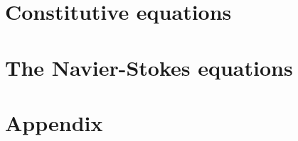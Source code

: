 \documentclass[12pt]{report}
\begin{document}
%


%


%


%

\chapter{Constitutive equations}



\chapter{The Navier-Stokes equations}







\chapter*{Appendix}

\newpage
\thispagestyle{empty}
\end{document}
